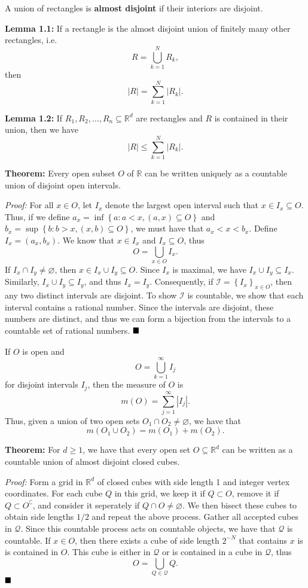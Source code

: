 \documentclass[12pt]{article}
\newcommand{\R}{\mathbb{R}}
\newcommand{\braceb}[1]{\left\{#1\right\}}
\newcommand{\vertb}[1]{\left\vert#1\right\vert}
\newcommand{\done}{\ensuremath{\strut\hfill\blacksquare}}
\begin{document}
A union of rectangles is \textbf{almost disjoint} if their interiors are
disjoint.

\textbf{Lemma 1.1:} If a rectangle is the almost disjoint union of finitely
many other rectangles, i.e.
\[
	R = \bigcup_{k = 1}^N R_k,
\]
then
\[
	\vertb{R} = \sum_{k = 1}^N \vertb{R_k}.
\]

\textbf{Lemma 1.2:} If \( R_1, R_2, \dots, R_n \subseteq \R^d \) are
rectangles and \( R \) is contained in their union, then we have
\[
	\vertb{R} \leq \sum_{k = 1}^N \vertb{R_k}.
\]

\textbf{Theorem:}
Every open subset \( O \) of \( \R \) can be written uniquely as a countable
union of disjoint open intervals.

\textit{Proof:}
For all \( x \in O \), let \( I_x \) denote the largest open interval such that
\( x \in I_x \subseteq O \).
Thus, if we define \( a_x = \inf \braceb{a : a < x, (a, x) \subseteq O } \) and
\( b_x = \sup \braceb{b : b > x, (x, b) \subseteq O }\), we must have that
\( a_x < x < b_x \).
Define \( I_x = (a_x, b_x) \).
We know that \( x \in I_x \) and \( I_x \subseteq O \), thus
\[
	O = \bigcup_{x \in O} I_x.
\]
If \( I_x \cap I_y \ne \varnothing \), then
\( x \in I_x \cup I_y \subseteq O \).
Since \( I_x \) is maximal, we have \( I_x \cup I_y \subseteq I_x \).
Similarly, \( I_x \cup I_y \subseteq I_y \), and thus \( I_x = I_y \).
Consequently, if \( \mathcal{I} = \braceb{I_x}_{x \in O } \), then any two
distinct intervals are disjoint.
To show \( \mathcal{I} \) is countable, we show that each interval contains a
rational number.
Since the intervals are disjoint, these numbers are distinct, and thus we can
form a bijection from the intervals to a countable set of rational numbers.
\done

If \( O \) is open and
\[
	O = \bigcup_{k = 1}^\infty I_j
\]
for disjoint intervals \( I_j \), then the measure of \( O \) is
\[
	m(O) = \sum_{j = 1}^\infty \vertb{I_j}.
\]
Thus, given a union of two open sets \( O_1 \cap O_2 \ne \varnothing \), we
have that
\[
	m(O_1 \cup O_2) = m(O_1) + m(O_2).
\]

\textbf{Theorem:}
For \( d \geq 1 \), we have that every open set \( O \subseteq \R^d \) can be
written as a countable union of almost disjoint closed cubes.

\textit{Proof:}
Form a grid in \( \R^d \) of closed cubes with side length 1 and integer
vertex coordinates.
For each cube \( Q \) in this grid, we keep it if \( Q \subset O \), remove it
if \( Q \subset O^\complement \), and consider it seperately if
\( Q \cap O \ne \varnothing \).
We then bisect these cubes to obtain side lengths \( 1 / 2 \) and repeat the
above process.
Gather all accepted cubes in \( \mathcal{Q} \).
Since this countable process acts on countable objects, we have that
\( \mathcal{Q} \) is countable.
If \( x \in O \), then there exists a cube of side length \( 2^{-N} \) that
contains \( x \) is is contained in \( O \).
This cube is either in \( \mathcal{Q} \) or is contained in a cube in
\( \mathcal{Q} \), thus
\[
	O = \bigcup_{Q \in \mathcal{Q}} Q.
\]
\done
\end{document}
